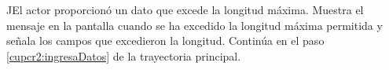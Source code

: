 \begin{UCtrayectoriaA}{J}{El actor proporcionó un dato que excede la longitud máxima.}
	\UCpaso[\UCsist] Muestra el mensaje  en la pantalla 
	cuando se ha excedido la longitud máxima permitida y señala los campos que excedieron la longitud.
	\UCpaso[] Continúa en el paso \ref{cupcr2:ingresaDatos} de la trayectoria principal.
\end{UCtrayectoriaA}
